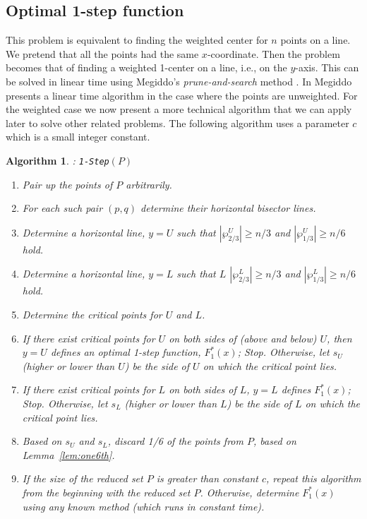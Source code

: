 \documentclass[preprint,10pt]{elsarticle}
\newtheorem{algorithm}{Algorithm}
\begin{document}
\subsection{Optimal 1-step function}\label{sec:1step}
This problem is equivalent to finding the weighted center for $n$ points on a line.
We pretend that all the points had the same $x$-coordinate.
Then the problem becomes that of finding a weighted 1-center on a line,
i.e., on the $y$-axis.
This can be solved in linear time using Megiddo's {\em prune-and-search} method \cite{bhattacharya2007,chen2015a,megiddo1983a}.
In \cite{megiddo1983b} Megiddo presents a linear time algorithm in the case where the
points are unweighted. 
For the weighted case we now present a more technical algorithm that we can apply
later to solve other related problems.
The following algorithm uses a parameter $c$ which is a small integer constant.

\begin{algorithm}{\rm :} {\tt 1-Step}$(P)$
\begin{enumerate}
\item
Pair up the points of $P$ arbitrarily.
\item
For each such pair $(p,q)$ determine their horizontal bisector lines. 
\item
Determine a horizontal line, $y=U$ such that $|\wp^U_{2/3}|\geq  n/3$
and $|\wp^U_{1/3}|\geq n/6$ hold.
\item
Determine a horizontal line, $y=L$ such that $L$ $|\wp^L_{2/3}|\geq  n/3$ and
$|\wp^L_{1/3}|\geq n/6$ hold.
\item
Determine the critical points for $U$ and $L$.
\item
If there exist critical points for $U$ on both sides of (above and below) $U$, 
then $y=U$ defines an optimal 1-step function, $F^*_1(x)$; Stop. 
Otherwise, let $s_U$ (higher or lower than $U$) be the side of $U$ on which the critical point
lies.
\item
If there exist critical points for $L$ on both sides of $L$,
$y=L$ defines $F^*_1(x)$; Stop.
Otherwise, let $s_L$ (higher or lower than $L$) be the side of $L$ on which the critical point
lies.
\item
Based on $s_U$ and $s_L$, discard 1/6 of the points from $P$,
based on Lemma~\ref{lem:one6th}.
\item
If the size of the reduced set $P$ is greater than constant $c$, 
repeat this algorithm from the beginning with the reduced set $P$.
Otherwise, determine $F^*_1(x)$ using any known method
(which runs in constant time).
\end{enumerate}
\end{algorithm}
\end{document}
